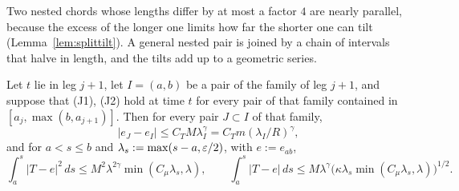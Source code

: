Two nested chords whose lengths differ by at most a factor $4$ are nearly parallel, because the excess of the longer
one limits how far the shorter one can tilt (Lemma~\ref{lem:splittilt}). A general nested pair is joined by a chain of
intervals that halve in length, and the tilts add up to a geometric series.

\begin{lemma}\label{lem:tiltchain}
Let $t$ lie in leg $j+1$, let $I=(a,b)$ be a pair of the family of leg $j+1$, and suppose that \textup{(J1)},
\textup{(J2)} hold at time $t$ for every pair of that family contained in $[a_j,\max(b,a_{j+1})]$. Then for every pair
$J\subset I$ of that family,
\[
|e_J-e_I|\le C_TM\lambda_I^\gamma=C_Tm(\lambda_I/R)^\gamma ,
\]
and for $a<s\le b$ and $\lambda_s:=\max(s-a,\varepsilon/2)$, with $e:=e_{ab}$,
\begin{equation}\label{eq:Emu}
\int_a^s|T-e|^2\,ds\le M^2\lambda^{2\gamma}\min(C_\mu\lambda_s,\lambda),\qquad
\int_a^s|T-e|\,ds\le M\lambda^\gamma\bigl(\kappa\lambda_s\min(C_\mu\lambda_s,\lambda)\bigr)^{1/2}.
\end{equation}
\end{lemma}

